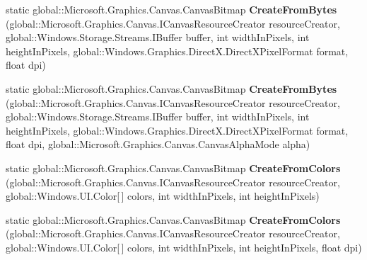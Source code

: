 \begin{DoxyCompactItemize}
\item 
\mbox{\label{class_microsoft_1_1_graphics_1_1_canvas_1_1_canvas_bitmap_af1daa19ada592de34b02ac1e97e88606}} 
static global\+::\+Microsoft.\+Graphics.\+Canvas.\+Canvas\+Bitmap {\bfseries Create\+From\+Bytes} (global\+::\+Microsoft.\+Graphics.\+Canvas.\+I\+Canvas\+Resource\+Creator resource\+Creator, global\+::\+Windows.\+Storage.\+Streams.\+I\+Buffer buffer, int width\+In\+Pixels, int height\+In\+Pixels, global\+::\+Windows.\+Graphics.\+Direct\+X.\+Direct\+X\+Pixel\+Format format, float dpi)
\item 
\mbox{\label{class_microsoft_1_1_graphics_1_1_canvas_1_1_canvas_bitmap_a86cbc0abd68451ea818e39d8079e60c9}} 
static global\+::\+Microsoft.\+Graphics.\+Canvas.\+Canvas\+Bitmap {\bfseries Create\+From\+Bytes} (global\+::\+Microsoft.\+Graphics.\+Canvas.\+I\+Canvas\+Resource\+Creator resource\+Creator, global\+::\+Windows.\+Storage.\+Streams.\+I\+Buffer buffer, int width\+In\+Pixels, int height\+In\+Pixels, global\+::\+Windows.\+Graphics.\+Direct\+X.\+Direct\+X\+Pixel\+Format format, float dpi, global\+::\+Microsoft.\+Graphics.\+Canvas.\+Canvas\+Alpha\+Mode alpha)
\item 
\mbox{\label{class_microsoft_1_1_graphics_1_1_canvas_1_1_canvas_bitmap_aa56711d36aa2bc46baefdbf6ca694427}} 
static global\+::\+Microsoft.\+Graphics.\+Canvas.\+Canvas\+Bitmap {\bfseries Create\+From\+Colors} (global\+::\+Microsoft.\+Graphics.\+Canvas.\+I\+Canvas\+Resource\+Creator resource\+Creator, global\+::\+Windows.\+U\+I.\+Color\mbox{[}$\,$\mbox{]} colors, int width\+In\+Pixels, int height\+In\+Pixels)
\item 
\mbox{\label{class_microsoft_1_1_graphics_1_1_canvas_1_1_canvas_bitmap_a488d3b7c9e0730ddce84772fc314dedc}} 
static global\+::\+Microsoft.\+Graphics.\+Canvas.\+Canvas\+Bitmap {\bfseries Create\+From\+Colors} (global\+::\+Microsoft.\+Graphics.\+Canvas.\+I\+Canvas\+Resource\+Creator resource\+Creator, global\+::\+Windows.\+U\+I.\+Color\mbox{[}$\,$\mbox{]} colors, int width\+In\+Pixels, int height\+In\+Pixels, float dpi)
\item 
\mbox{\label{class_microsoft_1_1_graphics_1_1_canvas_1_1_canvas_bitmap_a00bad59ca00bf7edd9ce60d8a4aded82}} 

\end{DoxyCompactItemize}
